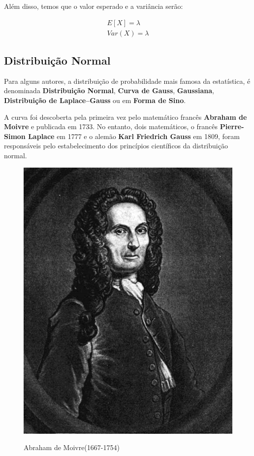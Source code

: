   
Além disso, temos que o valor esperado e a variância serão: 

$$
\begin{aligned}
E\left[X\right] =\lambda \\
Var\left(X\right) = \lambda
\end{aligned}
$$
 



\subsection{Distribuição Normal}

Para alguns autores, a distribuição de probabilidade mais famosa da estatística, é denominada \textbf{Distribuição Normal}, \textbf{Curva de Gauss}, \textbf{Gaussiana}, \textbf{Distribuição de Laplace–Gauss} ou em \textbf{Forma de Sino}.\vskip0.3cm 


A curva foi descoberta pela primeira vez pelo matemático francês \textbf{Abraham de Moivre} e publicada em 1733. No entanto, dois matemáticos, o francês \textbf{Pierre-Simon Laplace} em 1777 e o alemão \textbf{Karl Friedrich Gauss} em 1809, foram responsáveis pelo estabelecimento dos princípios científicos da distribuição normal.\vskip0.3cm 


\vspace{-0.5cm}
\begin{figure}
    \centering
    \caption{Abraham de Moivre(1667-1754)} 
    \centering
\includegraphics[scale=0.2]{figures/Abraham_de_moivre.jpeg}
    \label{fig:my_label6} 
\end{figure}

